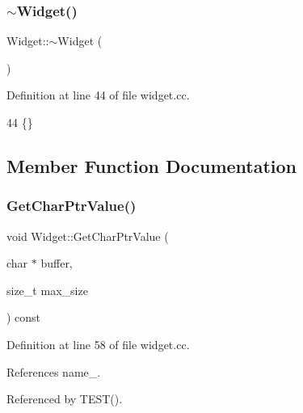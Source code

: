 \subsubsection{\texorpdfstring{$\sim$\+Widget()}{~Widget()}}
{\footnotesize\ttfamily Widget\+::$\sim$\+Widget (\begin{DoxyParamCaption}{ }\end{DoxyParamCaption})}



Definition at line 44 of file widget.\+cc.


\begin{DoxyCode}
44 \{\}
\end{DoxyCode}


\subsection{Member Function Documentation}
\mbox{\label{classWidget_a50791a556979f22f5593383143c7f815}} 
\subsubsection{\texorpdfstring{Get\+Char\+Ptr\+Value()}{GetCharPtrValue()}}
{\footnotesize\ttfamily void Widget\+::\+Get\+Char\+Ptr\+Value (\begin{DoxyParamCaption}\item[{char $\ast$}]{buffer,  }\item[{size\+\_\+t}]{max\+\_\+size }\end{DoxyParamCaption}) const}



Definition at line 58 of file widget.\+cc.



References name\+\_\+.



Referenced by T\+E\+S\+T().


